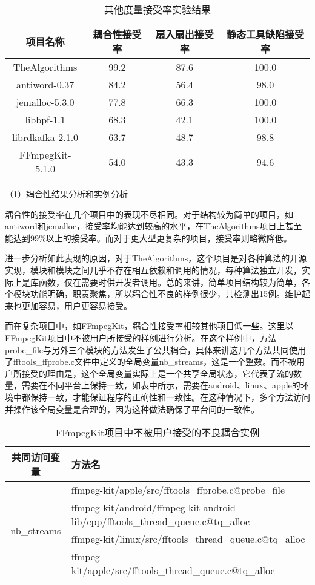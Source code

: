 \begin{table}[htbp]
\caption{其他度量接受率实验结果}
\vspace{0.5em}\centering\wuhao
\begin{tabular}{cccc}
\toprule
项目名称 & 耦合性接受率 & 扇入扇出接受率 & 静态工具缺陷接受率 \\
\midrule
TheAlgorithms & 99.2 & 87.6 & 100.0 \\
antiword-0.37 & 84.2 & 56.4 & 98.0 \\
jemalloc-5.3.0 & 77.8 & 66.3 & 100.0 \\
libbpf-1.1 & 68.3 & 42.1 & 100.0 \\
librdkafka-2.1.0 & 63.7 & 48.7 & 98.8 \\
FFmpegKit-5.1.0 & 54.0 & 43.3 & 94.6 \\
\bottomrule
\end{tabular}
\end{table}

（1）耦合性结果分析和实例分析

耦合性的接受率在几个项目中的表现不尽相同。对于结构较为简单的项目，如antiword和jemalloc，接受率均能达到较高的水平，在TheAlgorithms项目上甚至能达到99\%以上的接受率。而对于更大型更复杂的项目，接受率则略微降低。

进一步分析如此表现的原因，对于TheAlgorithms，这个项目是对各种算法的开源实现，模块和模块之间几乎不存在相互依赖和调用的情况，每种算法独立开发，实际上是库函数，仅在需要时供开发者调用。总的来讲，简单项目结构较为简单，各个模块功能明确，职责聚焦，所以耦合性不良的样例很少，共检测出15例。维护起来也更加容易，用户更容易接受。

而在复杂项目中，如FFmpegKit，耦合性接受率相较其他项目低一些。这里以FFmpegKit项目中不被用户所接受的样例进行分析。在这个样例中，方法probe\_file与另外三个模块的方法发生了公共耦合，具体来讲这几个方法共同使用了fftools\_ffprobe.c文件中定义的全局变量nb\_streams，这是一个整数。而不被用户所接受的理由是，这个全局变量实际上是一个共享全局状态，它代表了流的数量，需要在不同平台上保持一致，如表中所示，需要在android、linux、apple的环境中都保持一致，才能保证程序的正确性和一致性。在这种情况下，多个方法访问并操作该全局变量是合理的，因为这种做法确保了平台间的一致性。

\begin{table}[htbp]
\caption{FFmpegKit项目中不被用户接受的不良耦合实例}
\vspace{0.5em}\centering\wuhao
\begin{tabular}{cp{12cm}}
\toprule
共同访问变量 & 方法名 \\
\midrule
\multirow{4}{*}{nb\_streams} & ffmpeg-kit/apple/src/fftools\_ffprobe.c@probe\_file \\
                              & ffmpeg-kit/android/ffmpeg-kit-android-lib/cpp/fftools\_thread\_queue.c@tq\_alloc  \\
                              & ffmpeg-kit/linux/src/fftools\_thread\_queue.c@tq\_alloc  \\
                              & ffmpeg-kit/apple/src/fftools\_thread\_queue.c@tq\_alloc  \\
\bottomrule
\end{tabular}
\end{table}

